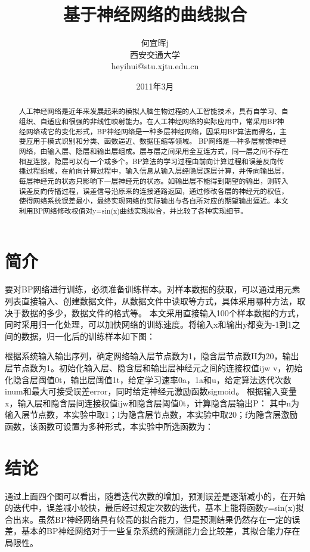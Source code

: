 \documentclass[]{article}
\date{2011年3月}
\title{基于神经网络的曲线拟合}
\author{何宜晖j\\西安交通大学\\heyihui@stu.xjtu.edu.cn}
\begin{document}
\begin{CJK}{UTF8}{gkai}
\maketitle

\begin{abstract}
人工神经网络是近年来发展起来的模拟人脑生物过程的人工智能技术，具有自学习、自组织、自适应和很强的非线性映射能力。在人工神经网络的实际应用中，常采用BP神经网络或它的变化形式，BP神经网络是一种多层神经网络，因采用BP算法而得名，主要应用于模式识别和分类、函数逼近、数据压缩等领域。  BP网络是一种多层前馈神经网络，由输入层、隐层和输出层组成。层与层之间采用全互连方式，同一层之间不存在相互连接，隐层可以有一个或多个。BP算法的学习过程由前向计算过程和误差反向传播过程组成，在前向计算过程中，输入信息从输入层经隐层逐层计算，并传向输出层，每层神经元的状态只影响下一层神经元的状态。如输出层不能得到期望的输出，则转入误差反向传播过程，误差信号沿原来的连接通路返回，通过修改各层的神经元的权值，使得网络系统误差最小，最终实现网络的实际输出与各自所对应的期望输出逼近。本文利用BP网络修改权值对y=sin(x)曲线实现拟合，并比较了各种实现细节。
\end{abstract}

\section{简介}
要对BP网络进行训练，必须准备训练样本。对样本数据的获取，可以通过用元素列表直接输入、创建数据文件，从数据文件中读取等方式，具体采用哪种方法，取决于数据的多少，数据文件的格式等。  本文采用直接输入100个样本数据的方式，同时采用归一化处理，可以加快网络的训练速度。将输入x和输出y都变为-1到1之间的数据，归一化后的训练样本如下图：

根据系统输入输出序列，确定网络输入层节点数为1，隐含层节点数H为20，输出层节点数为1。初始化输入层、隐含层和输出层神经元之间的连接权值ijw
v，初始化隐含层阈值0t，输出层阈值1t，给定学习速率0a，1a和u，给定算法迭代次数inum和最大可接受误差error，同时给定神经元激励函数sigmoid。
根据输入变量x，输入层和隐含层间连接权值ijw和隐含层阈值0t，计算隐含层输出P：
其中n为输入层节点数，本实验中取1；l为隐含层节点数，本实验中取20；f为隐含层激励函数，该函数可设置为多种形式，本实验中所选函数为：

\section{结论}
通过上面四个图可以看出，随着迭代次数的增加，预测误差是逐渐减小的，在开始的迭代中，误差减小较快，最后经过规定次数的迭代，基本上能将函数y=sin(x)拟合出来。虽然BP神经网络具有较高的拟合能力，但是预测结果仍然存在一定的误差，基本的BP神经网络对于一些复杂系统的预测能力会比较差，其拟合能力存在局限性。
\end{CJK}
\end{document}
